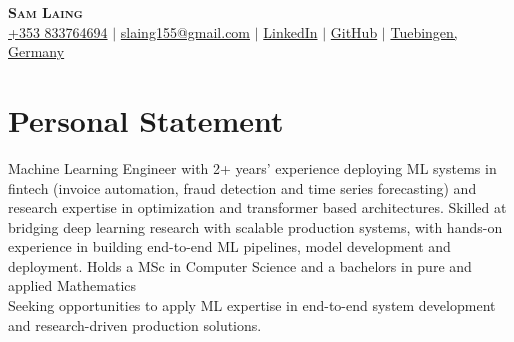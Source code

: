 \documentclass[letterpaper,10pt]{article}
\begin{document}

\begin{center}
    \textbf{\Huge \scshape Sam Laing} \\ \vspace{3pt}
    \small
    \faMobile \hspace{.5pt} \href{tel:353833764694}{+353 833764694}
    $|$
    \faAt \hspace{.5pt} \href{slaing155@gmail.com}{slaing155@gmail.com}
    $|$
    \faLinkedinSquare \hspace{.5pt} \href{https://www.linkedin.com/in/sam-laing-196403214}{LinkedIn}
    $|$
    \faGithub \hspace{.5pt} \href{https://github.com/sam-laing}{GitHub}
    $|$
    \faMapMarker \hspace{.5pt} \href{https://maps.app.goo.gl/zDdAp6SFpdj8fM548}{Tuebingen, Germany}
\end{center}

\section{Personal Statement}
Machine Learning Engineer with 2+ years’ experience deploying ML systems in fintech (invoice automation, fraud detection and time series forecasting) and research expertise in optimization and transformer based architectures. Skilled at bridging deep learning research with scalable production systems, with hands-on experience in building end-to-end ML pipelines, model development and deployment. Holds a MSc in Computer Science and a bachelors in pure and applied Mathematics\\
Seeking opportunities to apply ML expertise in end-to-end system development and research-driven production solutions.

\end{document}
